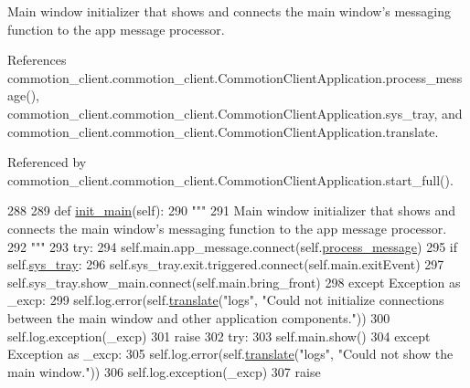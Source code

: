 \begin{DoxyVerb}Main window initializer that shows and connects the main window's messaging function to the app message processor.
\end{DoxyVerb}
 

References commotion\-\_\-client.\-commotion\-\_\-client.\-Commotion\-Client\-Application.\-process\-\_\-message(), commotion\-\_\-client.\-commotion\-\_\-client.\-Commotion\-Client\-Application.\-sys\-\_\-tray, and commotion\-\_\-client.\-commotion\-\_\-client.\-Commotion\-Client\-Application.\-translate.



Referenced by commotion\-\_\-client.\-commotion\-\_\-client.\-Commotion\-Client\-Application.\-start\-\_\-full().


\begin{DoxyCode}
288 
289     \textcolor{keyword}{def }\hyperlink{classcommotion__client_1_1commotion__client_1_1CommotionClientApplication_a1ed67f317a1ddd84b65ef39a848732bf}{init\_main}(self):
290         \textcolor{stringliteral}{"""}
291 \textcolor{stringliteral}{        Main window initializer that shows and connects the main window's messaging function to the app
       message processor.}
292 \textcolor{stringliteral}{        """}
293         \textcolor{keywordflow}{try}:
294             self.main.app\_message.connect(self.\hyperlink{classcommotion__client_1_1commotion__client_1_1CommotionClientApplication_a981d54a4d40a4345a253be2b2a541127}{process\_message})
295             \textcolor{keywordflow}{if} self.\hyperlink{classcommotion__client_1_1commotion__client_1_1CommotionClientApplication_a48a8bf39339f834c94353ca68444176f}{sys\_tray}:
296                 self.sys\_tray.exit.triggered.connect(self.main.exitEvent)
297                 self.sys\_tray.show\_main.connect(self.main.bring\_front)
298         \textcolor{keywordflow}{except} Exception \textcolor{keyword}{as} \_excp:
299             self.log.error(self.\hyperlink{classcommotion__client_1_1commotion__client_1_1CommotionClientApplication_a57e951c9b241fb0e0c70055b4ca1b6f7}{translate}(\textcolor{stringliteral}{"logs"}, \textcolor{stringliteral}{"Could not initialize connections between the
       main window and other application components."}))
300             self.log.exception(\_excp)
301             \textcolor{keywordflow}{raise}
302         \textcolor{keywordflow}{try}:
303             self.main.show()
304         \textcolor{keywordflow}{except} Exception \textcolor{keyword}{as} \_excp:
305             self.log.error(self.\hyperlink{classcommotion__client_1_1commotion__client_1_1CommotionClientApplication_a57e951c9b241fb0e0c70055b4ca1b6f7}{translate}(\textcolor{stringliteral}{"logs"}, \textcolor{stringliteral}{"Could not show the main window."}))
306             self.log.exception(\_excp)
307             \textcolor{keywordflow}{raise}

\end{DoxyCode}
